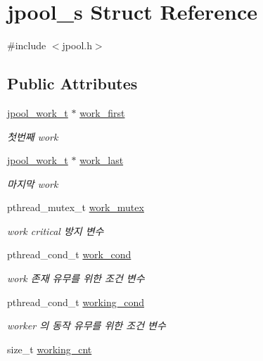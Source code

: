 \hypertarget{structjpool__s}{\section{jpool\-\_\-s Struct Reference}
\label{structjpool__s}
}


{\ttfamily \#include $<$jpool.\-h$>$}

\subsection*{Public Attributes}
\begin{DoxyCompactItemize}
\item 
\hyperlink{structjpool__work__t}{jpool\-\_\-work\-\_\-t} $\ast$ \hyperlink{structjpool__s_aa2625fbb89fc87f0cb418649d26ea4c0}{work\-\_\-first}
\begin{DoxyCompactList}\small\item\em 첫번째 work \end{DoxyCompactList}\item 
\hyperlink{structjpool__work__t}{jpool\-\_\-work\-\_\-t} $\ast$ \hyperlink{structjpool__s_a12a7e1581bce36aadf5834fb10740ffb}{work\-\_\-last}
\begin{DoxyCompactList}\small\item\em 마지막 work \end{DoxyCompactList}\item 
pthread\-\_\-mutex\-\_\-t \hyperlink{structjpool__s_a726c4fc88db49d0ed13ac37252fafc57}{work\-\_\-mutex}
\begin{DoxyCompactList}\small\item\em work critical 방지 변수 \end{DoxyCompactList}\item 
pthread\-\_\-cond\-\_\-t \hyperlink{structjpool__s_ac76152a46045dbba3e0a33e8b7e3e71b}{work\-\_\-cond}
\begin{DoxyCompactList}\small\item\em work 존재 유무를 위한 조건 변수 \end{DoxyCompactList}\item 
pthread\-\_\-cond\-\_\-t \hyperlink{structjpool__s_a947ecfa20ce4f5b9c63906232637361f}{working\-\_\-cond}
\begin{DoxyCompactList}\small\item\em worker 의 동작 유무를 위한 조건 변수 \end{DoxyCompactList}\item 
size\-\_\-t \hyperlink{structjpool__s_a914d89a44ced20367584327bcd6c0f76}{working\-\_\-cnt}

\end{DoxyCompactItemize}
